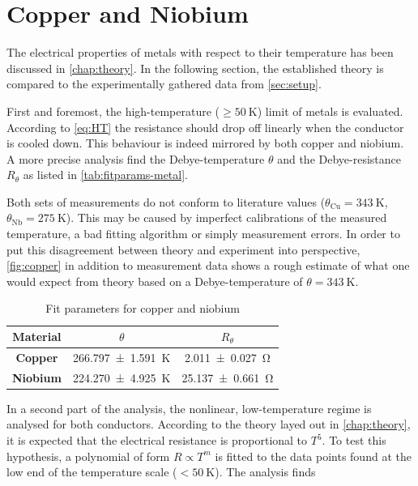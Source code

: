 
\section{Copper and Niobium}
\label{sec:metals}

The electrical properties of metals with respect to their temperature has been 
discussed in \autoref{chap:theory}. In the following section, the established theory is compared to the experimentally gathered data from \autoref{sec:setup}.

First and foremost, the high-temperature ($\geq\SI{50}{\kelvin}$) limit of metals is
evaluated. According to \autoref{eq:HT} the resistance should drop off linearly when
the conductor is cooled down. This behaviour is indeed mirrored by both copper and 
niobium. A more precise analysis find the Debye-temperature $\theta$ and the 
Debye-resistance $R_\theta$ as listed in \autoref{tab:fitparams-metal}.

Both sets of measurements do not conform to literature values ($\theta_\text{Cu}
=\SI{343}{\kelvin}$, $\theta_\text{Nb}=\SI{275}{\kelvin}$). This may be caused by
imperfect calibrations of the measured temperature, a bad fitting algorithm or simply
measurement errors. In order to put this disagreement between theory and experiment
into perspective, \autoref{fig:copper} in addition to measurement data shows a 
rough estimate of what one would expect from theory based on a Debye-temperature of 
$\theta = \SI{343}{\kelvin}$.

\begingroup
\renewcommand{\arraystretch}{1.3}
\begin{table}
	\begin{center}
	\caption{Fit parameters for copper and niobium}
	\begin{tabular*}{0.7\textwidth}{@{\extracolsep{\fill}} ccc}
  \toprule
	\hline
  Material & $\theta$ & $R_\theta$  \\
	\hline
  \textbf{Copper} & \SI{266.797\pm1.591}{\kelvin} & \SI{2.011\pm0.027}{\ohm} \\
  \textbf{Niobium} & \SI{224.270\pm4.925}{\kelvin} & \SI{25.137\pm0.661}{\ohm} \\ 
  \bottomrule
	\end{tabular*}
	\label{tab:fitparams-metal}
	\end{center}
\end{table}
\endgroup

In a second part of the analysis, the nonlinear, low-temperature regime is analysed
for both conductors. According to the theory layed out in \autoref{chap:theory}, it 
is expected that the electrical resistance is proportional to $T^5$. To test this 
hypothesis, a polynomial of form $R\propto T^m$ is fitted to the data points found at
the low end of the temperature scale ($<\SI{50}{\kelvin}$). The analysis finds

